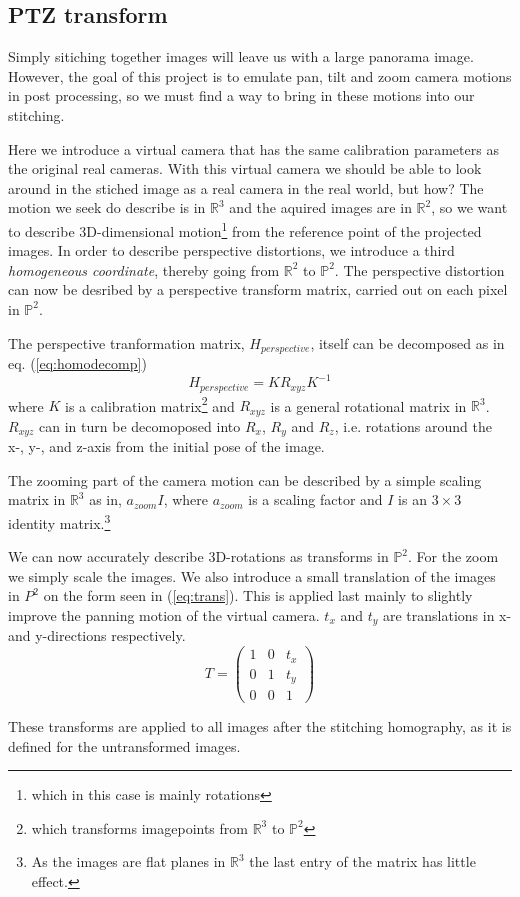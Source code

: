 \subsection{PTZ transform}
	Simply sitiching together images will leave us with a large panorama image. However, the goal of this project is to emulate pan, tilt and zoom camera motions in post processing, so we must find a way to bring in these motions into our stitching.

	Here we introduce a virtual camera that has the same calibration parameters as the original real cameras. With this virtual camera we should be able to look around in the stiched image as a real camera in the real world, but how? The motion we seek do describe is in $\mathbb{R}^3$ and the aquired images are in $\mathbb{R}^2$, so we want to describe 3D-dimensional motion\footnote{which in this case is mainly rotations} from the reference point of the projected images. In order to describe perspective distortions, we introduce a third \emph{homogeneous coordinate}, thereby going from $\mathbb{R}^2$ to $\mathbb{P}^2$. The perspective distortion can now be desribed by a perspective transform matrix, carried out on each pixel in $\mathbb{P}^2$. \cite{hartley2003Multiple}

	The perspective tranformation matrix, $H_{perspective}$, itself can be decomposed as in eq. (\ref{eq:homodecomp})
	\begin{equation}
		H_{perspective}=KR_{xyz}K^{-1}
		\label{eq:homodecomp}
	\end{equation}
	where $K$ is a calibration matrix\footnote{which transforms imagepoints from $\mathbb{R}^3$ to $\mathbb{P}^2$} and $R_{xyz}$ is a general rotational matrix in $\mathbb{R}^3$.
$R_{xyz}$ can in turn be decomoposed into $R_x$, $R_y$ and $R_z$, i.e. rotations around the x-, y-, and z-axis from the initial pose of the image.

	The zooming part of the camera motion can be described by a simple scaling matrix in $\mathbb{R}^3$ as in, $a_{zoom}I$, where $a_{zoom}$ is a scaling factor and $I$ is an $3 \times 3$ identity matrix.\footnote{As the images are flat planes in $\mathbb{R}^3$ the last entry of the matrix has little effect.}

	We can now accurately describe 3D-rotations as transforms in $\mathbb{P}^2$. For the zoom we simply scale the images.
	We also introduce a small translation of the images in $P^2$ on the form seen in (\ref{eq:trans}). This is applied last mainly to slightly improve the panning motion of the virtual camera. $t_x$ and $t_y$ are translations in x- and y-directions respectively.
\begin{equation}
	T=\begin{pmatrix}
		1 & 0 & t_x \\
		0 & 1 & t_y \\
		0 & 0 & 1
	\end{pmatrix}
	\label{eq:trans}
\end{equation}

These transforms are applied to all images after the stitching homography, as it is defined for the untransformed images.
